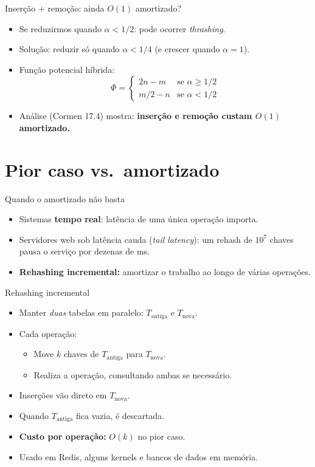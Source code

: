 \documentclass[aspectratio=169]{beamer}
\begin{document}
\begin{frame}{Inserção + remoção: ainda $O(1)$ amortizado?}
\begin{itemize}
    \item Se reduzirmos quando $\alpha < 1/2$: pode ocorrer \emph{thrashing}.
    \item Solução: reduzir só quando $\alpha < 1/4$ (e crescer quando $\alpha = 1$).
    \item Função potencial híbrida:
    \[
    \Phi = \begin{cases}
        2n - m & \text{se } \alpha \geq 1/2 \\
        m/2 - n & \text{se } \alpha < 1/2
    \end{cases}
    \]
    \item Análise (Cormen 17.4) mostra: \textbf{inserção e remoção custam $O(1)$
    amortizado.}
\end{itemize}
\end{frame}

\section{Pior caso vs.\ amortizado}

\begin{frame}{Quando o amortizado não basta}
\begin{itemize}
    \item Sistemas \textbf{tempo real}: latência de uma única operação importa.
    \item Servidores web sob latência cauda (\emph{tail latency}): um rehash de
    $10^7$ chaves pausa o serviço por dezenas de ms.
    \item \textbf{Rehashing incremental:} amortizar o trabalho ao longo de várias
    operações.
\end{itemize}
\end{frame}

\begin{frame}{Rehashing incremental}
\begin{itemize}
    \item Manter \emph{duas} tabelas em paralelo: $T_{\text{antiga}}$ e $T_{\text{nova}}$.
    \item Cada operação:
    \begin{itemize}
        \item Move $k$ chaves de $T_{\text{antiga}}$ para $T_{\text{nova}}$.
        \item Realiza a operação, consultando ambas se necessário.
    \end{itemize}
    \item Inserções vão direto em $T_{\text{nova}}$.
    \item Quando $T_{\text{antiga}}$ fica vazia, é descartada.
    \item \textbf{Custo por operação:} $O(k)$ no pior caso.
    \item Usado em Redis, alguns kernels e bancos de dados em memória.
\end{itemize}
\end{frame}
\end{document}
